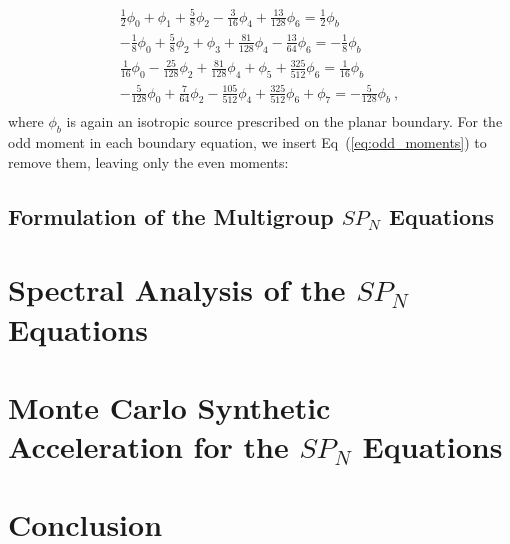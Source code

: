 \documentclass[letterpaper,12pt]{article}
\begin{document}
\begin{subequations}
  \begin{gather}
    \frac{1}{2}\phi_0 + \phi_1 + \frac{5}{8}\phi_2 -
    \frac{3}{16}\phi_4 + \frac{13}{128}\phi_6 =
    \frac{1}{2}\phi_{b}\\ -\frac{1}{8}\phi_0 + \frac{5}{8}\phi_2 +
    \phi_3 + \frac{81}{128}\phi_4 - \frac{13}{64}\phi_6 =
    -\frac{1}{8}\phi_{b}\\ \frac{1}{16}\phi_0 - \frac{25}{128}\phi_2 +
    \frac{81}{128}\phi_4 + \phi_5 + \frac{325}{512}\phi_6 =
    \frac{1}{16}\phi_{b}\\ -\frac{5}{128}\phi_0 + \frac{7}{64}\phi_2 -
    \frac{105}{512}\phi_4 + \frac{325}{512}\phi_6 + \phi_7 =
    -\frac{5}{128}\phi_{b}\:,\\
  \end{gather}
  \label{eq:spn_bnd_integrated}
\end{subequations}
where $\phi_b$ is again an isotropic source prescribed on the planar
boundary. For the odd moment in each boundary equation, we insert
Eq~(\ref{eq:odd_moments}) to remove them, leaving only the even moments:

\subsection{Formulation of the Multigroup $SP_N$ Equations}
\label{subsec:mg_spn_equations}

\section{Spectral Analysis of the $SP_N$ Equations}
\label{sec:spectral_analysis}

\section{Monte Carlo Synthetic Acceleration for the $SP_N$ Equations}
\label{sec:monte_carlo}

\section{Conclusion}
\label{sec:conclusion}

\pagebreak
 

\end{document}
